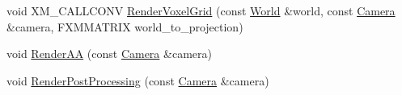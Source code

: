 \begin{DoxyCompactItemize}
\item 
void X\+M\+\_\+\+C\+A\+L\+L\+C\+O\+NV \mbox{\hyperlink{classmage_1_1rendering_1_1_renderer_1_1_impl_adb7265bf1333368a57e5071ef3f56fca}{Render\+Voxel\+Grid}} (const \mbox{\hyperlink{classmage_1_1rendering_1_1_world}{World}} \&world, const \mbox{\hyperlink{classmage_1_1rendering_1_1_camera}{Camera}} \&camera, F\+X\+M\+M\+A\+T\+R\+IX world\+\_\+to\+\_\+projection)
\item 
void \mbox{\hyperlink{classmage_1_1rendering_1_1_renderer_1_1_impl_a6fffbc6a0de26d1a41a94998cdb98f20}{Render\+AA}} (const \mbox{\hyperlink{classmage_1_1rendering_1_1_camera}{Camera}} \&camera)
\item 
void \mbox{\hyperlink{classmage_1_1rendering_1_1_renderer_1_1_impl_ae4d71c1e7ec4412983d1728337767b3c}{Render\+Post\+Processing}} (const \mbox{\hyperlink{classmage_1_1rendering_1_1_camera}{Camera}} \&camera)
\end{DoxyCompactItemize}
